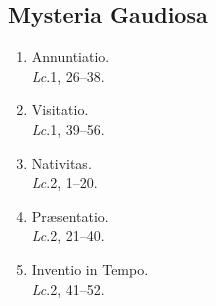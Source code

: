 \subsection*{Mysteria Gaudiosa}
\vspace{-0.5em}

\begin{enumerate}[label={\roman*.}, itemsep=0pt,]

\item
    Annuntiatio.
\\  {\it Lc}.\@ 1, 26--38.
\item
    Visitatio.
\\  {\it Lc}.\@ 1, 39--56.
\item
    Nativitas.
\\  {\it Lc}.\@ 2, 1--20.
\item
    Præsentatio.
\\  {\it Lc}.\@ 2, 21--40.
\item
    Inventio in Tempo.
\\  {\it Lc}.\@ 2, 41--52.
\end{enumerate}